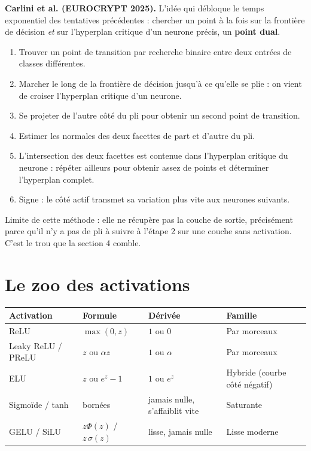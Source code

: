 \documentclass[11pt]{article}
\begin{document}
\textbf{Carlini et al. (EUROCRYPT 2025).} L'idée qui débloque le temps exponentiel des tentatives précédentes : chercher un point à la fois sur la frontière de décision \emph{et} sur l'hyperplan critique d'un neurone précis, un \textbf{point dual}.

\begin{enumerate}
  \item Trouver un point de transition par recherche binaire entre deux entrées de classes différentes.
  \item Marcher le long de la frontière de décision jusqu'à ce qu'elle se plie : on vient de croiser l'hyperplan critique d'un neurone.
  \item Se projeter de l'autre côté du pli pour obtenir un second point de transition.
  \item Estimer les normales des deux facettes de part et d'autre du pli.
  \item L'intersection des deux facettes est contenue dans l'hyperplan critique du neurone : répéter ailleurs pour obtenir assez de points et déterminer l'hyperplan complet.
  \item Signe : le côté actif transmet sa variation plus vite aux neurones suivants.
\end{enumerate}

Limite de cette méthode : elle ne récupère pas la couche de sortie, précisément parce qu'il n'y a pas de pli à suivre à l'étape 2 sur une couche sans activation. C'est le trou que la section 4 comble.

\section{Le zoo des activations}

\begin{table}[h]
\centering
\small
\begin{tabular}{llll}
\toprule
Activation & Formule & Dérivée & Famille \\
\midrule
ReLU & $\max(0,z)$ & $1$ ou $0$ & Par morceaux \\
Leaky ReLU / PReLU & $z$ ou $\alpha z$ & $1$ ou $\alpha$ & Par morceaux \\
ELU & $z$ ou $e^z-1$ & $1$ ou $e^z$ & Hybride (courbe côté négatif) \\
Sigmoïde / tanh & bornées & jamais nulle, s'affaiblit vite & Saturante \\
GELU / SiLU & $z\Phi(z)$ / $z\,\sigma(z)$ & lisse, jamais nulle & Lisse moderne \\
\bottomrule
\end{tabular}
\end{table}
\end{document}
